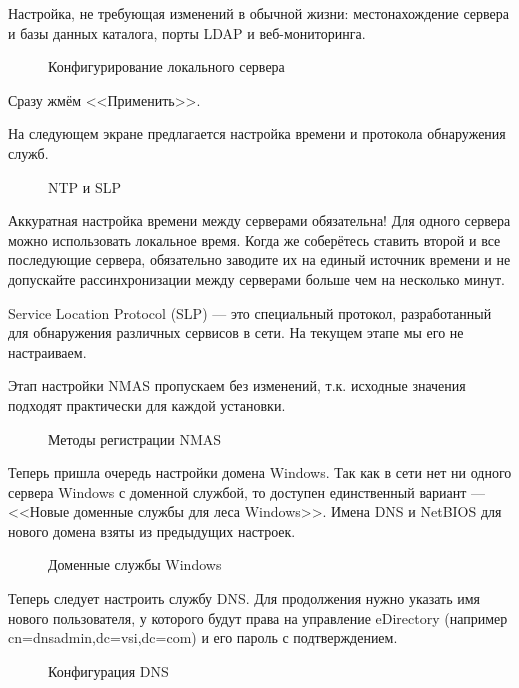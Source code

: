 Настройка, не требующая изменений в обычной жизни: местонахождение сервера и базы данных каталога, порты LDAP и веб-мониторинга.
\begin{figure}[H]
\caption{Конфигурирование локального сервера}
\end{figure}
Сразу жмём <<Применить>>.
\clearpage

На следующем экране предлагается настройка времени и протокола обнаружения служб.
\begin{figure}[H]
\caption{NTP и SLP}
\end{figure}
Аккуратная настройка времени между серверами обязательна! Для одного сервера можно использовать локальное время. Когда же соберётесь ставить второй и все последующие сервера, обязательно заводите их на единый источник времени и не допускайте рассинхронизации между серверами больше чем на несколько минут.\par
Service Location Protocol (SLP) --- это специальный протокол, разработанный для обнаружения различных сервисов в сети. На текущем этапе мы его не настраиваем.
\clearpage

Этап настройки NMAS пропускаем без изменений, т.к. исходные значения подходят практически для каждой установки.
\begin{figure}[H]
\caption{Методы регистрации NMAS}
\end{figure}
\clearpage

Теперь пришла очередь настройки домена Windows. Так как в сети нет ни одного сервера Windows с доменной службой, то доступен единственный вариант --- <<Новые доменные службы для леса Windows>>. Имена DNS и NetBIOS для нового домена взяты из предыдущих настроек. 
\begin{figure}[H]
\caption{Доменные службы Windows}
\end{figure}
\clearpage

Теперь следует настроить службу DNS. Для продолжения нужно указать имя нового пользователя, у которого будут права на управление eDirectory (например cn=dnsadmin,dc=vsi,dc=com) и его пароль с подтверждением.
\begin{figure}[H]
\caption{Конфигурация DNS}
\end{figure}
\clearpage

